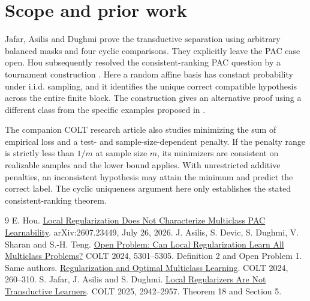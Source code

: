 \documentclass[11pt]{article}
\begin{document}
\section{Scope and prior work}
Jafar, Asilis and Dughmi \cite{trans} prove the transductive separation using arbitrary balanced masks and four cyclic comparisons. They explicitly leave the PAC case open. Hou subsequently resolved the consistent-ranking PAC question by a tournament construction \cite{hou}. Here a random affine basis has constant probability under i.i.d. sampling, and it identifies the unique correct compatible hypothesis across the entire finite block. The construction gives an alternative proof using a different class from the specific examples proposed in \cite{open,trans}.

The companion COLT research article \cite{long} also studies minimizing the sum of empirical loss and a test- and sample-size-dependent penalty. If the penalty range is strictly less than $1/m$ at sample size $m$, its minimizers are consistent on realizable samples and the lower bound applies. With unrestricted additive penalties, an inconsistent hypothesis may attain the minimum and predict the correct label. The cyclic uniqueness argument here only establishes the stated consistent-ranking theorem.

\begin{thebibliography}{9}
 E. Hou. \href{https://arxiv.org/abs/2607.23449}{Local Regularization Does Not Characterize Multiclass PAC Learnability}. arXiv:2607.23449, July 26, 2026.
 J. Asilis, S. Devic, S. Dughmi, V. Sharan and S.-H. Teng. \href{https://proceedings.mlr.press/v247/asilis24b.html}{Open Problem: Can Local Regularization Learn All Multiclass Problems?} COLT 2024, 5301--5305. Definition 2 and Open Problem 1.
 Same authors. \href{https://proceedings.mlr.press/v247/asilis24a.html}{Regularization and Optimal Multiclass Learning}. COLT 2024, 260--310.
 S. Jafar, J. Asilis and S. Dughmi. \href{https://proceedings.mlr.press/v291/jafar25a.html}{Local Regularizers Are Not Transductive Learners}. COLT 2025, 2942--2957. Theorem 18 and Section 5.
\end{thebibliography}
\end{document}
